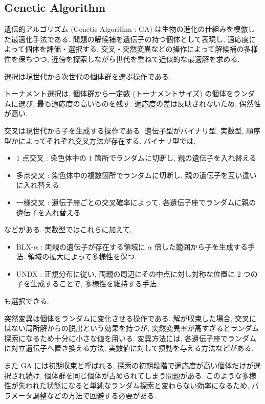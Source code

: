 \changeindent{0cm}
\subsection{Genetic Algorithm}
\changeindent{2cm}
\label{sec:02_ga}
遺伝的アルゴリズム (Genetic Algorithm : GA) は生物の進化の仕組みを模倣した最適化手法である.
問題の解候補を遺伝子の持つ個体として表現し, 適応度によって個体を評価・選択する.
交叉・突然変異などの操作によって解候補の多様性を保ちつつ,
近傍を探索しながら世代を重ねて近似的な最適解を求める.

選択は現世代から次世代の個体群を選ぶ操作である.

トーナメント選択は, 個体群から一定数 (トーナメントサイズ) の個体をランダムに選び, 最も適応度の高いものを残す.
適応度の差は反映されないため, 偶然性が高い.


交叉は現世代から子を生成する操作である.
遺伝子型がバイナリ型, 実数型, 順序型かによってそれぞれ交叉方法が存在する.
バイナリ型では,
\begin{itemize}
  \item 1 点交叉 : 染色体中の 1 箇所でランダムに切断し, 親の遺伝子を入れ替える
  \item 多点交叉 : 染色体中の複数箇所でランダムに切断し, 親の遺伝子を互い違いに入れ替える
  \item 一様交叉 : 遺伝子座ごとの交叉確率によって, 各遺伝子座でランダムに親の遺伝子を入れ替える
\end{itemize}
などがある.
実数型ではこれらに加えて,
\begin{itemize}
  \item BLX-$\alpha$ : 両親の遺伝子が存在する領域に $\alpha$ 倍した範囲から子を生成する手法. 領域の拡大によって多様性を保つ.
  \item UNDX : 正規分布に従い, 両親の周辺にその中点に対し対称な位置に 2 つの子を生成することで, 多様性を維持する手法.
\end{itemize}
も選択できる.

突然変異は個体をランダムに変化させる操作である.
解が収束した場合, 交叉にはない局所解からの脱出という効果を持つが,
突然変異率が高すぎるとランダム探索になるため十分に小さな値を用いる.
変異方法には, 各遺伝子座でランダムに対立遺伝子へ置き換える方法, 実数値に対して摂動を与える方法などがある.

また GA には初期収束と呼ばれる, 探索の初期段階で適応度が高い個体だけが選択され続け,
個体群を同じ個体が占められてしまう問題がある.
このような多様性が失われた状態になると単純なランダム探索と変わらない効率になるため,
パラメータ調整などの方法で回避する必要がある.

